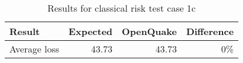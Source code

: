 \begin{table}[htbp]

\centering
\begin{tabular}{ l r r r }

\hline
\rowcolor{anti-flashwhite}
\bf{Result} & \bf{Expected} & \bf{OpenQuake} & \bf{Difference}\\
\hline
Average loss & 43.73 & 43.73 & 0\% \\
\hline
\end{tabular}

\caption{Results for classical risk test case 1c}
\label{tab:result-classical-risk-1c}
\end{table}